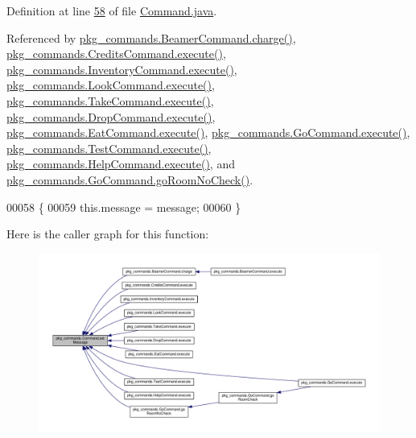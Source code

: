Definition at line \hyperlink{Command_8java_source_l00058}{58} of file \hyperlink{Command_8java_source}{Command.\-java}.



Referenced by \hyperlink{BeamerCommand_8java_source_l00067}{pkg\-\_\-commands.\-Beamer\-Command.\-charge()}, \hyperlink{CreditsCommand_8java_source_l00023}{pkg\-\_\-commands.\-Credits\-Command.\-execute()}, \hyperlink{InventoryCommand_8java_source_l00023}{pkg\-\_\-commands.\-Inventory\-Command.\-execute()}, \hyperlink{LookCommand_8java_source_l00026}{pkg\-\_\-commands.\-Look\-Command.\-execute()}, \hyperlink{TakeCommand_8java_source_l00027}{pkg\-\_\-commands.\-Take\-Command.\-execute()}, \hyperlink{DropCommand_8java_source_l00027}{pkg\-\_\-commands.\-Drop\-Command.\-execute()}, \hyperlink{EatCommand_8java_source_l00028}{pkg\-\_\-commands.\-Eat\-Command.\-execute()}, \hyperlink{GoCommand_8java_source_l00028}{pkg\-\_\-commands.\-Go\-Command.\-execute()}, \hyperlink{TestCommand_8java_source_l00032}{pkg\-\_\-commands.\-Test\-Command.\-execute()}, \hyperlink{HelpCommand_8java_source_l00033}{pkg\-\_\-commands.\-Help\-Command.\-execute()}, and \hyperlink{GoCommand_8java_source_l00061}{pkg\-\_\-commands.\-Go\-Command.\-go\-Room\-No\-Check()}.


\begin{DoxyCode}
00058                                               \{
00059         this.message = message;
00060     \}
\end{DoxyCode}


Here is the caller graph for this function\-:
\nopagebreak
\begin{figure}[H]
\begin{center}
\leavevmode
\includegraphics[width=350pt]{classpkg__commands_1_1Command_ae210ff216fe908b111ba1c988a963d13_icgraph}
\end{center}
\end{figure}


